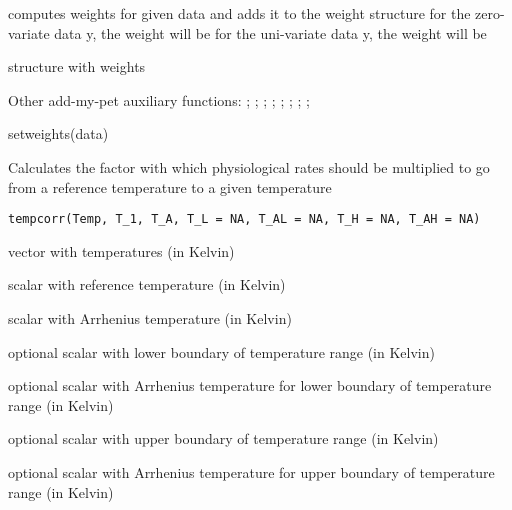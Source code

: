 \documentclass[a4paper]{book}
\begin{document}
%
\begin{Details}\relax
computes weights for given data and adds it to the weight structure
for the zero-variate data y, the weight will be
for the uni-variate data y, the weight will be
\end{Details}
%
\begin{Value}
structure with weights
\end{Value}
%
\begin{SeeAlso}\relax
Other add-my-pet auxiliary functions: ;
; ;
; ;
; ;
;
\end{SeeAlso}
%
\begin{Examples}
\begin{ExampleCode}
setweights(data)
\end{ExampleCode}
\end{Examples}
%
\begin{Description}\relax
Calculates the factor with which physiological rates should be multiplied to go from a reference temperature to a given temperature
\end{Description}
%
\begin{Usage}
\begin{verbatim}
tempcorr(Temp, T_1, T_A, T_L = NA, T_AL = NA, T_H = NA, T_AH = NA)
\end{verbatim}
\end{Usage}
%
\begin{Arguments}
\begin{ldescription}
\item[\code{Temp}] vector with temperatures (in Kelvin)

\item[\code{T\_1}] scalar with reference temperature (in Kelvin)

\item[\code{T\_A}] scalar with Arrhenius temperature (in Kelvin)

\item[\code{T\_L}] optional scalar with lower boundary of temperature range (in Kelvin)

\item[\code{T\_AL}] optional scalar with Arrhenius temperature for lower boundary of temperature range (in Kelvin)

\item[\code{T\_H}] optional scalar with upper boundary of temperature range (in Kelvin)

\item[\code{T\_AH}] optional scalar with Arrhenius temperature for upper boundary of temperature range (in Kelvin)
\end{ldescription}
\end{Arguments}
\end{document}
